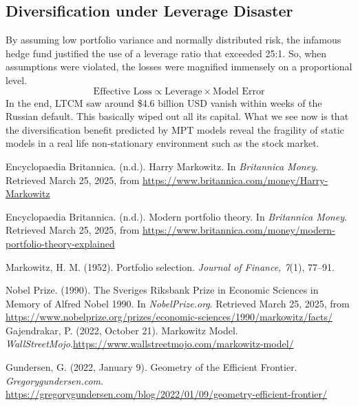 \documentclass[11pt]{article}
\begin{document}
    \subsection{Diversification under Leverage Disaster}
    By assuming low portfolio variance and normally distributed risk, the infamous hedge fund justified the use of a leverage ratio that exceeded 25:1. So, when assumptions were violated, the losses were magnified immensely on a proportional level.
    \begin{equation}
        \text{Effective Loss} \propto \text{Leverage} \times \text{Model Error}
    \end{equation}
    In the end, LTCM saw around \$4.6 billion USD vanish within weeks of the Russian default. This basically wiped out all its capital. What we see now is that the diversification benefit predicted by MPT models reveal the fragility of static models in a real life non-stationary environment such as the stock market.


\newpage


\begin{spacing}{1.5}
\begin{thebibliography}{9}

Encyclopaedia Britannica. (n.d.). Harry Markowitz. In \textit{Britannica Money}. Retrieved March 25, 2025, from \url{https://www.britannica.com/money/Harry-Markowitz}

Encyclopaedia Britannica. (n.d.). Modern portfolio theory. In \textit{Britannica Money}. Retrieved March 25, 2025, from \url{https://www.britannica.com/money/modern-portfolio-theory-explained}

Markowitz, H. M. (1952). Portfolio selection. \textit{Journal of Finance, 7}(1), 77--91.

Nobel Prize. (1990). The Sveriges Riksbank Prize in Economic Sciences in Memory of Alfred Nobel 1990. In \textit{NobelPrize.org}. Retrieved March 25, 2025, from \url{https://www.nobelprize.org/prizes/economic-sciences/1990/markowitz/facts/}
Gajendrakar, P. (2022, October 21). Markowitz Model. \textit{WallStreetMojo}.\url{https://www.wallstreetmojo.com/markowitz-model/}

Gundersen, G. (2022, January 9). Geometry of the Efficient Frontier. \textit{Gregorygundersen.com}.\url{ https://gregorygundersen.com/blog/2022/01/09/geometry-efficient-frontier/}

\end{thebibliography}
\end{spacing}
\end{document}
